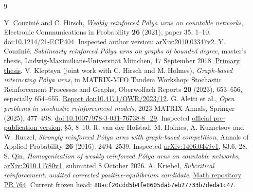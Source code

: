 \documentclass[11pt,a4paper]{article}
\begin{document}
\begin{thebibliography}{9}\small\raggedright
{} Y. Couzini\'e and C. Hirsch,
\emph{Weakly reinforced P\'olya urns on countable networks},
Electronic Communications in Probability \textbf{26} (2021), paper 35, 1--10.
\href{https://doi.org/10.1214/21-ECP404}{doi:10.1214/21-ECP404}.
Inspected author version: \href{https://arxiv.org/abs/2010.03347v2}{arXiv:2010.03347v2}.
 Y. Couzini\'e,
\emph{Sublinearly reinforced P\'olya urns on graphs of bounded degree},
master's thesis, Ludwig-Maximilians-Universit\"at M\"unchen, 17 September 2018.
\href{https://www.theorie.physik.uni-muenchen.de/TMP/theses/couziniethesis.pdf}{Primary thesis}.
 V. Kleptsyn (joint work with C. Hirsch and M. Holmes),
\emph{Graph-based interacting P\'olya urns}, in MATRIX-MFO Tandem Workshop:
Stochastic Reinforcement Processes and Graphs, Oberwolfach Reports
\textbf{20} (2023), 653--656, especially 654--655.
\href{https://doi.org/10.4171/OWR/2023/12}{Report doi:10.4171/OWR/2023/12}.
 G. Aletti et al.,
\emph{Open problems in stochastic reinforcement models},
2023 MATRIX Annals, Springer (2025), 477--498.
\href{https://doi.org/10.1007/978-3-031-76738-8_29}{doi:10.1007/978-3-031-76738-8\_29}.
Inspected \href{https://www.matrix-inst.org.au/wp_Matrix2016/wp-content/uploads/2023/Aletti.pdf}{official pre-publication version}, \S5, 8--10.
 R. van der Hofstad, M. Holmes, A. Kuznetsov and W. Ruszel,
\emph{Strongly reinforced P\'olya urns with graph-based competition},
Annals of Applied Probability \textbf{26} (2016), 2494--2539.
Inspected \href{https://arxiv.org/abs/1406.0449v1}{arXiv:1406.0449v1}, \S3.6, 28.
 S. Qin,
\emph{Homogenization of weakly reinforced P\'olya urns on countable networks},
\href{https://arxiv.org/abs/2610.11780v1}{arXiv:2610.11780v1}, submitted 8 October 2026.
 A. Kriebel,
\emph{Subcritical reinforcement: audited corrected positive-equilibrium candidate},
\href{https://github.com/AlecKriebel/Math/pull/764}{Math repository PR 764}.
Current frozen head: \texttt{88acf20cdd5b4fe8605dab7eb27733b7deda1c47}.
\end{thebibliography}
\end{document}
